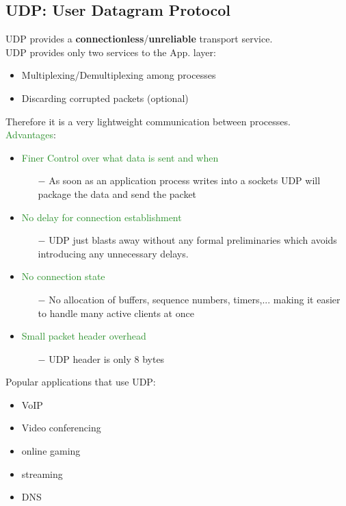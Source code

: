 \documentclass[a4paper, fontsize=8pt, landscape, DIV=1]{scrartcl}
\begin{document}
\begin{multicols*}{4}
		\subsection{UDP: User Datagram Protocol}
		UDP provides a \textbf{connectionless}/\textbf{unreliable} transport
		service.\\
		UDP provides only two services to the App. layer:
		\begin{itemize}[noitemsep]
			\item Multiplexing/Demultiplexing among processes
			\item Discarding corrupted packets (optional)
		\end{itemize}
		Therefore it is a very lightweight communication between processes.\\
		\textcolor{ForestGreen}{Advantages}: 
		\vspace{-0.2cm}
		\begin{itemize}[noitemsep]
			\item \textcolor{ForestGreen}{Finer Control over what data is sent and when}
			\begin{itemize}
				\item[$-$] As soon as an application process writes into a sockets UDP will
				package the data and send the packet
			\end{itemize}
			\item \textcolor{ForestGreen}{No delay for connection establishment}
			\begin{itemize}
				\item[$-$] UDP just blasts away without any formal preliminaries which
				avoids introducing any unnecessary delays. 
			\end{itemize}
			\item \textcolor{ForestGreen}{No connection state}
			\begin{itemize}
				\item[$-$] No allocation of buffers, sequence numbers, timers,... making it
				easier to handle many active clients at once
			\end{itemize}
			\item \textcolor{ForestGreen}{Small packet header overhead}
			\begin{itemize}
				\item[$-$] UDP header is only 8 bytes
			\end{itemize}
		\end{itemize}
		Popular applications that use UDP: 
		\begin{itemize}[noitemsep]
			\item VoIP
			\item Video conferencing
			\item online gaming
			\item streaming
			\item DNS
		\end{itemize}
		

\end{multicols*}
\end{document}
